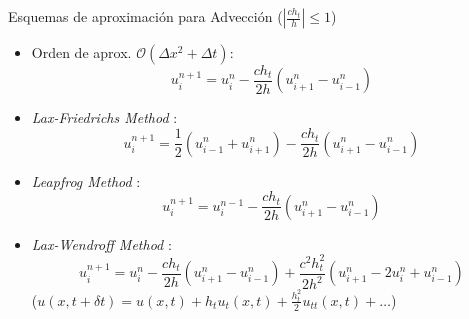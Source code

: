 \documentclass{beamer}
\begin{document}
\begin{frame}{Esquemas de aproximaci\'on para Advecci\'on ($\left|\frac{c h_t}{h}\right| \leq 1$)}

\begin{itemize}
\item Orden de aprox. $\mathcal{O}(\Delta x^2 + \Delta t)$: 
\begin{displaymath}
u_{i}^{n+1} = u_{i}^{n} - \dfrac{c h_t}{2 h}\left(u_{i+1}^{n} - u_{i-1}^{n} \right)
\end{displaymath}	
\item \textit{Lax-Friedrichs Method} :
\begin{displaymath}
u_{i}^{n+1} =  \dfrac{1}{2}\left(u_{i-1}^{n} + u_{i+1}^{n}\right) - \dfrac{c h_t}{2 h}\left(u_{i+1}^{n} - u_{i-1}^{n} \right)
\end{displaymath}		
\item \textit{Leapfrog Method} :
\begin{displaymath}
u_{i}^{n+1} =  u_{i}^{n-1} - \dfrac{c h_t}{2 h}\left(u_{i+1}^{n} - u_{i-1}^{n} \right)
\end{displaymath}		
\item \textit{Lax-Wendroff Method} :
\begin{displaymath}
u_{i}^{n+1} = u_{i}^{n} - \dfrac{c h_t}{2 h}\left(u_{i+1}^{n} - u_{i-1}^{n} \right) + \dfrac{c^2 h_t^2}{2 h^2}\left(u_{i+1}^{n} - 2u_{i}^{n} + u_{i-1}^{n} \right)
\end{displaymath}	
({\footnotesize $u(x,t+\delta t) = u(x,t) + h_t u_t(x,t) + \frac{h_t^2}{2} u_{tt}(x,t)+\dots  $})

\end{itemize}

\end{frame}
\end{document}
